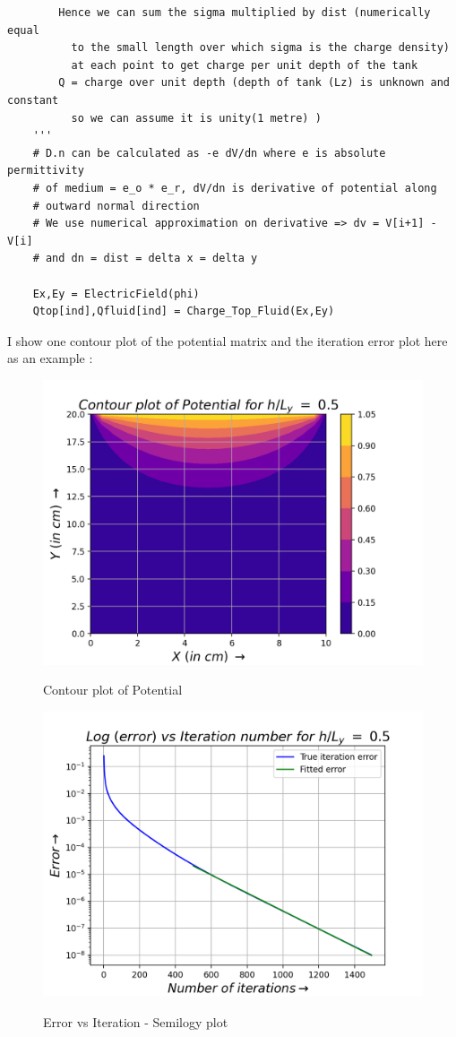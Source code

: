 \documentclass[11pt, a4paper]{article}
\begin{document}
\begin{verbatim}
        Hence we can sum the sigma multiplied by dist (numerically equal 
          to the small length over which sigma is the charge density) 
          at each point to get charge per unit depth of the tank
        Q = charge over unit depth (depth of tank (Lz) is unknown and constant
          so we can assume it is unity(1 metre) )
    '''
    # D.n can be calculated as -e dV/dn where e is absolute permittivity
    # of medium = e_o * e_r, dV/dn is derivative of potential along 
    # outward normal direction
    # We use numerical approximation on derivative => dv = V[i+1] - V[i] 
    # and dn = dist = delta x = delta y

    Ex,Ey = ElectricField(phi)
    Qtop[ind],Qfluid[ind] = Charge_Top_Fluid(Ex,Ey)
\end{verbatim}
I show one contour plot of the potential matrix and the iteration error plot here as an example :
\begin{figure}[H]
   	\centering
   	\includegraphics[scale=0.6]{cont_potl.png}
   	\label{fig:cont_potl}
   	\caption{Contour plot of Potential}
\end{figure}
\begin{figure}[H]
   	\centering
   	\includegraphics[scale=0.6]{iter_error.png}
   	\label{fig:iter_error}
   	\caption{Error vs Iteration - Semilogy plot}
\end{figure}
\end{document}
